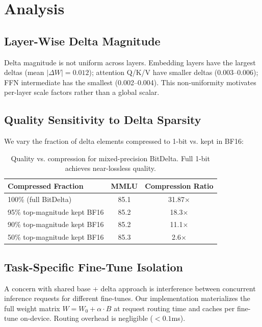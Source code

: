 \documentclass[11pt,a4paper]{article}
\begin{document}
\section{Analysis}

\subsection{Layer-Wise Delta Magnitude}

Delta magnitude is not uniform across layers. Embedding layers have the largest
deltas (mean $|\Delta W| = 0.012$); attention Q/K/V have smaller deltas
(0.003--0.006); FFN intermediate has the smallest (0.002--0.004). This non-uniformity
motivates per-layer scale factors rather than a global scalar.

\subsection{Quality Sensitivity to Delta Sparsity}

We vary the fraction of delta elements compressed to 1-bit vs. kept in BF16:

\begin{table}[H]
\centering
\begin{tabular}{lcc}
\toprule
\textbf{Compressed Fraction} & \textbf{MMLU} & \textbf{Compression Ratio} \\
\midrule
100\% (full BitDelta) & 85.1 & 31.87$\times$ \\
95\% top-magnitude kept BF16 & 85.2 & 18.3$\times$ \\
90\% top-magnitude kept BF16 & 85.2 & 11.1$\times$ \\
50\% top-magnitude kept BF16 & 85.3 & 2.6$\times$ \\
\bottomrule
\end{tabular}
\caption{Quality vs. compression for mixed-precision BitDelta. Full 1-bit achieves near-lossless quality.}
\end{table}

\subsection{Task-Specific Fine-Tune Isolation}

A concern with shared base + delta approach is interference between concurrent
inference requests for different fine-tunes. Our implementation materializes the
full weight matrix $W = W_0 + \alpha \cdot B$ at request routing time and caches
per fine-tune on-device. Routing overhead is negligible ($<0.1$ms).
\end{document}
